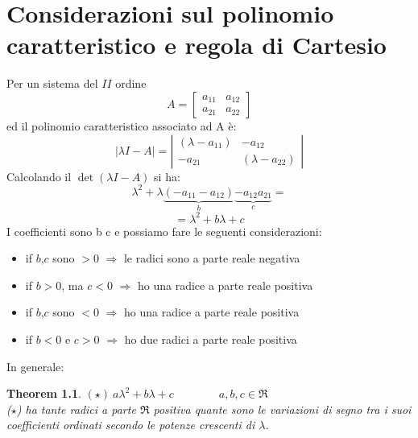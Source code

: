 \documentclass[a4paper]{report}
\begin{document}
\chapter{Considerazioni sul polinomio caratteristico e regola di
  Cartesio}\label{apx:stabil} 
Per un sistema del $II$ ordine
\begin{displaymath}
  A=\left[
    \begin {array}	{ll} 
      a_{11} & a_{12}\\
      a_{21} & a_{22}
    \end{array}\right]
\end{displaymath}
ed il polinomio caratteristico associato ad A \`e:
\begin{displaymath}
  |\lambda I-A| = \left|
  \begin{array}{ll}(\lambda
    -a_{11})&-a_{12}\\-a_{21} & (\lambda -a_{22})
  \end{array}\right|
\end{displaymath}
Calcolando il $\det(\lambda I - A)$ si ha:
\begin{displaymath}
  \lambda^2 + \lambda\underbrace{(-a_{11}-a_{12})}_b\underbrace{-a_{12}a_{21}}_c =
\end{displaymath}
\begin{displaymath}
  =\lambda^2+b\lambda+c
\end{displaymath}
I coefficienti sono  \qquad b \qquad c \qquad e possiamo fare
le seguenti considerazioni: 
\begin {itemize}
\item if $b$,$c$ sono $>0$  $\Rightarrow$  le radici sono a parte reale negativa
\item if $b>0$, ma $c<0$   $\Rightarrow$  ho una radice a parte reale positiva
\item if $b$,$c$ sono $<0$  $\Rightarrow$  ho una radice a parte reale positiva
\item if $b<0$ e $c >0$  $\Rightarrow$  ho due radici a parte reale positiva
\end{itemize}
In generale: 
\newtheorem{cartesio}{Theorem}[chapter]
\begin{cartesio}
  $(\star) ~a\lambda^2+b\lambda+c \qquad \qquad a,b,c \in \Re$\\
  ($\star$) ha tante radici a parte $\Re$ positiva quante sono le
  variazioni di segno tra i suoi coefficienti ordinati secondo le
  potenze crescenti di $\lambda$.
\end{cartesio}
\end{document}
